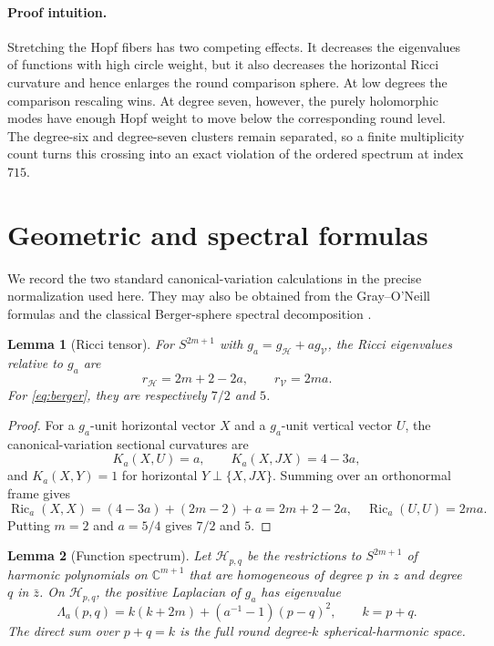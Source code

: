 \documentclass[10pt]{article}
\newtheorem{lemma}{Lemma}
\newcommand{\Ric}{\operatorname{Ric}}
\newcommand{\C}{\mathbb C}
\begin{document}
\paragraph{Proof intuition.}
Stretching the Hopf fibers has two competing effects.  It decreases the
eigenvalues of functions with high circle weight, but it also decreases the
horizontal Ricci curvature and hence enlarges the round comparison sphere.
At low degrees the comparison rescaling wins.  At degree seven, however, the
purely holomorphic modes have enough Hopf weight to move below the corresponding
round level.  The degree-six and degree-seven clusters remain separated, so a
finite multiplicity count turns this crossing into an exact violation of the
ordered spectrum at index $715$.

\section{Geometric and spectral formulas}
We record the two standard canonical-variation calculations in the precise
normalization used here.  They may also be obtained from the Gray--O'Neill
formulas and the classical Berger-sphere spectral decomposition
\cite{Besse,Tanno}.

\begin{lemma}[Ricci tensor]\label{lem:ricci}
For $S^{2m+1}$ with $g_a=g_{\mathcal H}+a g_{\mathcal V}$, the Ricci
eigenvalues relative to $g_a$ are
\[
 r_{\mathcal H}=2m+2-2a,\qquad r_{\mathcal V}=2ma.
\]
For \eqref{eq:berger}, they are respectively $7/2$ and $5$.
\end{lemma}

\begin{proof}
For a $g_a$-unit horizontal vector $X$ and a $g_a$-unit vertical vector $U$,
the canonical-variation sectional curvatures are
\[
 K_a(X,U)=a,\qquad K_a(X,JX)=4-3a,
\]
and $K_a(X,Y)=1$ for horizontal $Y\perp\{X,JX\}$.  Summing over an
orthonormal frame gives
\[
 \Ric_a(X,X)=(4-3a)+(2m-2)+a=2m+2-2a,
 \quad \Ric_a(U,U)=2ma.
\]
Putting $m=2$ and $a=5/4$ gives $7/2$ and $5$.
\end{proof}

\begin{lemma}[Function spectrum]\label{lem:spectrum}
Let $\mathcal H_{p,q}$ be the restrictions to $S^{2m+1}$ of harmonic
polynomials on $\C^{m+1}$ that are homogeneous of degree $p$ in $z$ and degree
$q$ in $\bar z$.  On $\mathcal H_{p,q}$, the positive Laplacian of $g_a$ has
eigenvalue
\begin{equation}\label{eq:berger-eigen}
 \Lambda_a(p,q)=k(k+2m)+(a^{-1}-1)(p-q)^2,\qquad k=p+q.
\end{equation}
The direct sum over $p+q=k$ is the full round degree-$k$ spherical-harmonic
space.
\end{lemma}
\end{document}
